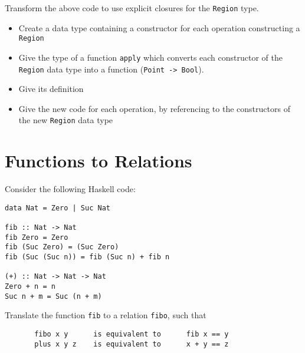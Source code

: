 \documentclass{article}
\newcommand{\answer}[1]{}
\begin{document}
Transform the above code to use explicit closures for the
\texttt{Region} type.

\begin{itemize}
\item Create a data type containing a constructor for each operation constructing a \texttt{Region} 
\item Give the type of a function \texttt{apply} which converts each constructor of the \texttt{Region} data type into a function (\texttt{Point -> Bool}). 
\item Give its definition 
\item Give the new code for each operation, by referencing to the constructors of the new \texttt{Region} data type 
\end{itemize}

\answer{
  \begin{verbatim}
data Region = Outside Region
            | Intersect Region Region
            | Within Float Point

apply :: Region -> Point -> Bool
apply (Outside r) p       = not (apply r p)
apply (Intersect r1 r2) p = r1 p && r2 p
apply (Within range p1) p2 = norm2 (p1 .-. p2) <= range * range

outside :: Region -> Region
outside r = Outside r

intersect :: Region -> Region -> Region
intersect r1 r2 = Intersect r1 r2

withinRange :: Float -> Point -> Region
withinRange range p1 p2 = Within range p1 p2
  \end{verbatim}
}

\newpage
\section{Functions to Relations}

Consider the following Haskell code:
\begin{verbatim}
data Nat = Zero | Suc Nat

fib :: Nat -> Nat
fib Zero = Zero
fib (Suc Zero) = (Suc Zero)
fib (Suc (Suc n)) = fib (Suc n) + fib n

(+) :: Nat -> Nat -> Nat
Zero + n = n
Suc n + m = Suc (n + m)
\end{verbatim}

Translate the function \texttt{fib} to a relation \texttt{fibo}, such that
\begin{verbatim}
       fibo x y      is equivalent to      fib x == y
       plus x y z    is equivalent to      x + y == z
\end{verbatim}
\end{document}
